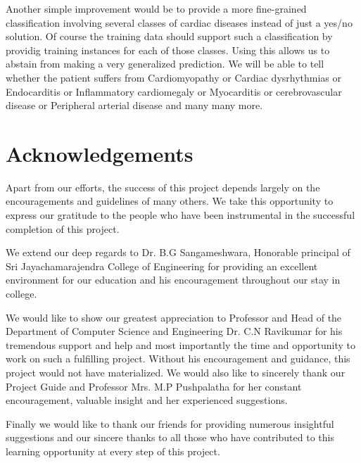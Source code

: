 \documentclass{acm_proc_article-sp}
\begin{document}
Another simple improvement would be to provide a more fine-grained classification involving several classes of cardiac diseases instead of just a yes/no solution. Of course the training data should support such a classification by providig training instances for each of those classes. Using this allows us to abstain from making a very generalized prediction. We will be able to tell whether the patient suffers from Cardiomyopathy or Cardiac dysrhythmias or Endocarditis or Inflammatory cardiomegaly or Myocarditis or cerebrovascular disease or Peripheral arterial disease and many many more.  

\section{Acknowledgements}

Apart from our efforts, the success of this project depends largely on the encouragements and guidelines of many others. We take this opportunity to express our gratitude to the people who have been instrumental in the successful completion of this project.

We extend our deep regards to Dr. B.G Sangameshwara, Honorable principal of Sri Jayachamarajendra College of Engineering for providing an excellent environment for our education and his encouragement throughout our stay in college.

We would like to show our greatest appreciation to Professor and Head of the Department of Computer Science and Engineering Dr. C.N Ravikumar for his tremendous support and help and most importantly the time and opportunity to work on such a fulfilling project. Without his encouragement and guidance, this project would not have materialized. We would also like to sincerely thank our Project Guide and Professor Mrs. M.P Pushpalatha for her constant encouragement, valuable insight and her experienced suggestions.

Finally we would like to thank our friends for providing numerous insightful suggestions and our sincere thanks to all those who have contributed to this learning opportunity at every step of this project.

\newpage
%

%
\end{document}
